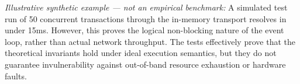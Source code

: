 \textit{Illustrative synthetic example — not an empirical benchmark:} A simulated test run of 50 concurrent transactions through the in-memory transport resolves in under 15ms. However, this proves the logical non-blocking nature of the event loop, rather than actual network throughput. The tests effectively prove that the theoretical invariants hold under ideal execution semantics, but they do not guarantee invulnerability against out-of-band resource exhaustion or hardware faults.
